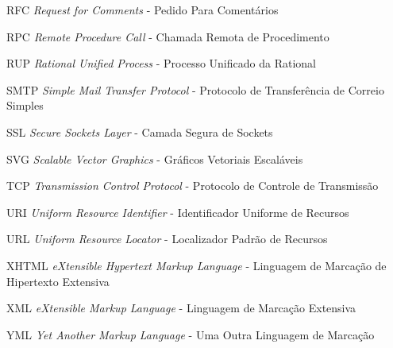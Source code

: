\begin{siglas}
	\item[RFC] \textit{Request for Comments} - Pedido Para Comentários
	\item[RPC] \textit{Remote Procedure Call} - Chamada Remota de Procedimento\footnotemark[1]
	\item[RUP] \textit{Rational Unified Process} - Processo Unificado da Rational
	\item[SMTP] \textit{Simple Mail Transfer Protocol} - Protocolo de Transferência de Correio Simples
	\item[SSL] \textit{Secure Sockets Layer} - Camada Segura de Sockets
	\item[SVG] \textit{Scalable Vector Graphics} - Gráficos Vetoriais Escaláveis
	\item[TCP] \textit{Transmission Control Protocol} - Protocolo de Controle de Transmissão
	\item[URI] \textit{Uniform Resource Identifier} - Identificador Uniforme de Recursos
	\item[URL] \textit{Uniform Resource Locator} - Localizador Padrão de Recursos
	\item[XHTML] \textit{eXtensible Hypertext Markup Language} - Linguagem de Marcação de Hipertexto Extensiva
	\item[XML] \textit{eXtensible Markup Language} - Linguagem de Marcação Extensiva
	\item[YML] \textit{Yet Another Markup Language} - Uma Outra Linguagem de Marcação\footnotemark[1]
\end{siglas}


